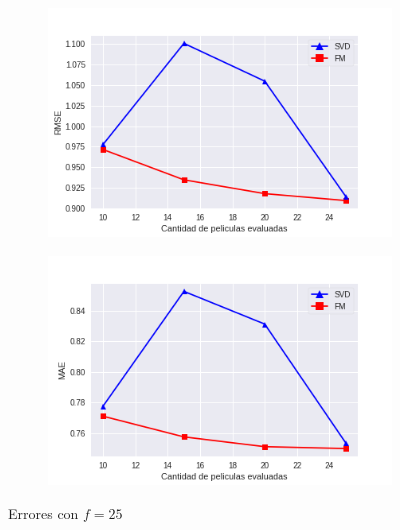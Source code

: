\documentclass[hidelinks,12pt,a4paper]{book}
\theoremstyle{plain}
\theoremstyle{definition}
\begin{document}
\begin{figure}[ht]
\centering
    \begin{subfigure}[b]{0.5\textwidth}            
            \includegraphics[width=\textwidth]{graficos/entr-25-rmse.png}
    \end{subfigure}%
    \begin{subfigure}[b]{0.5\textwidth}
            \centering
            \includegraphics[width=\textwidth]{graficos/entr-25-mae.png}
    \end{subfigure}
    \caption{Errores con $f=25$}\label{fig:entr2}
\end{figure}
\end{document}
